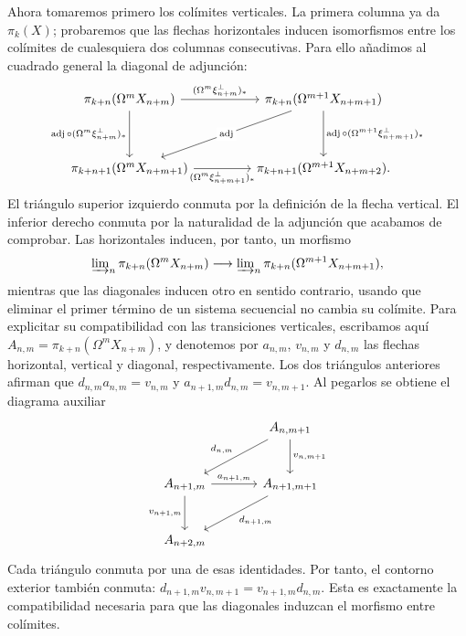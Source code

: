 Ahora tomaremos primero los colímites verticales. La primera columna ya da $\pi_k(X)$; probaremos que las flechas horizontales inducen isomorfismos entre los colímites de cualesquiera dos columnas consecutivas. Para ello añadimos al cuadrado general la diagonal de adjunción:
\[
\begin{tikzcd}[column sep=4.5em,row sep=huge]
\pi_{k+n}(\Omega^mX_{n+m})
\arrow[r,"(\Omega^m\xi_{n+m}^{\perp})_*"]
\arrow[d,"\operatorname{adj}\circ(\Omega^m\xi_{n+m}^{\perp})_*"']
& \pi_{k+n}(\Omega^{m+1}X_{n+m+1})
\arrow[dl,"\operatorname{adj}" description]
\arrow[d,"\operatorname{adj}\circ(\Omega^{m+1}\xi_{n+m+1}^{\perp})_*"]\\
\pi_{k+n+1}(\Omega^mX_{n+m+1})
\arrow[r,"(\Omega^m\xi_{n+m+1}^{\perp})_*"']
& \pi_{k+n+1}(\Omega^{m+1}X_{n+m+2}).
\end{tikzcd}
\]
El triángulo superior izquierdo conmuta por la definición de la flecha vertical. El inferior derecho conmuta por la naturalidad de la adjunción que acabamos de comprobar. Las horizontales inducen, por tanto, un morfismo
\[
\varinjlim\nolimits_n\pi_{k+n}(\Omega^mX_{n+m})
\longrightarrow
\varinjlim\nolimits_n\pi_{k+n}(\Omega^{m+1}X_{n+m+1}),
\]
mientras que las diagonales inducen otro en sentido contrario, usando que eliminar el primer término de un sistema secuencial no cambia su colímite. Para explicitar su compatibilidad con las transiciones verticales, escribamos aquí $A_{n,m}=\pi_{k+n}(\Omega^mX_{n+m})$, y denotemos por $a_{n,m}$, $v_{n,m}$ y $d_{n,m}$ las flechas horizontal, vertical y diagonal, respectivamente. Los dos triángulos anteriores afirman que $d_{n,m}a_{n,m}=v_{n,m}$ y $a_{n+1,m}d_{n,m}=v_{n,m+1}$. Al pegarlos se obtiene el diagrama auxiliar
\[
\begin{tikzcd}[column sep=large,row sep=large]
& A_{n,m+1} \arrow[dl,"d_{n,m}"'] \arrow[d,"v_{n,m+1}"]\\
A_{n+1,m} \arrow[r,"a_{n+1,m}"] \arrow[d,"v_{n+1,m}"']
& A_{n+1,m+1} \arrow[dl,"d_{n+1,m}"]\\
A_{n+2,m} &
\end{tikzcd}
\]
Cada triángulo conmuta por una de esas identidades. Por tanto, el contorno exterior también conmuta: $d_{n+1,m}v_{n,m+1}=v_{n+1,m}d_{n,m}$. Esta es exactamente la compatibilidad necesaria para que las diagonales induzcan el morfismo entre colímites.

